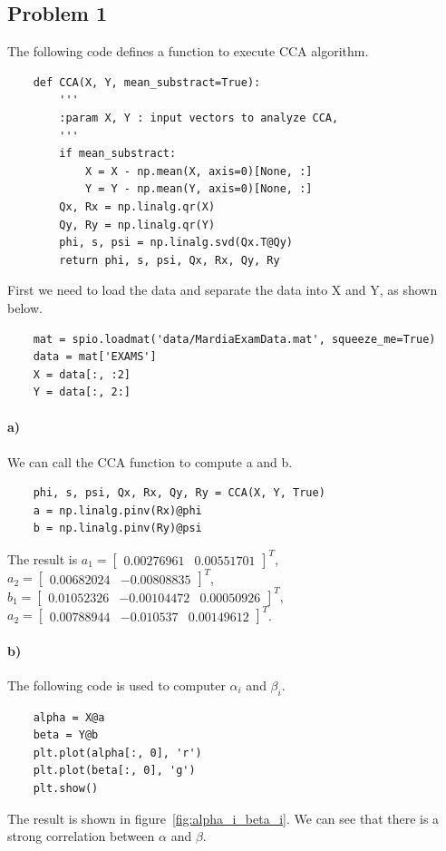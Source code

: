 \documentclass{article}
\begin{document}
\subsection*{Problem 1}
The following code defines a function to execute CCA algorithm.
\begin{lstlisting}
	def CCA(X, Y, mean_substract=True):
	    '''
	    :param X, Y : input vectors to analyze CCA, 
	    '''
	    if mean_substract:
	        X = X - np.mean(X, axis=0)[None, :]
	        Y = Y - np.mean(Y, axis=0)[None, :]
	    Qx, Rx = np.linalg.qr(X)
	    Qy, Ry = np.linalg.qr(Y)
	    phi, s, psi = np.linalg.svd(Qx.T@Qy)
	    return phi, s, psi, Qx, Rx, Qy, Ry
\end{lstlisting}
First we need to load the data and separate the data into X and Y, as shown below.
\begin{lstlisting}
	mat = spio.loadmat('data/MardiaExamData.mat', squeeze_me=True)
	data = mat['EXAMS']
	X = data[:, :2]
	Y = data[:, 2:]
\end{lstlisting}
\paragraph{a)} We can call the CCA function to compute a and b. 
\begin{lstlisting}
	phi, s, psi, Qx, Rx, Qy, Ry = CCA(X, Y, True)
	a = np.linalg.pinv(Rx)@phi
	b = np.linalg.pinv(Ry)@psi
\end{lstlisting}
The result is $a_1 = \begin{bmatrix} 0.00276961 &  0.00551701 \end{bmatrix} ^T$, $a_2 = \begin{bmatrix} 0.00682024 & -0.00808835 \end{bmatrix} ^T$,  $b_1 = \begin{bmatrix} 0.01052326 & -0.00104472 &  0.00050926 \end{bmatrix} ^T$, $a_2 = \begin{bmatrix} 0.00788944 & -0.010537  &  0.00149612 \end{bmatrix} ^T$.
\paragraph{b)} The following code is used to computer $\alpha_i$ and $\beta_i$. 
\begin{lstlisting}
	alpha = X@a
	beta = Y@b
	plt.plot(alpha[:, 0], 'r')
	plt.plot(beta[:, 0], 'g')
	plt.show()
\end{lstlisting}
The result is shown in figure~\ref{fig:alpha_i_beta_i}. We can see that there is a strong correlation between $\alpha$ and $\beta$. 
\end{document}
